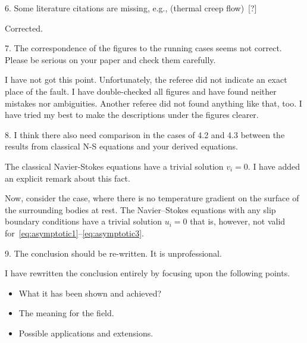 \documentclass{article}
\begin{document}
\begin{quoting}
6. Some literature citations are missing, e.g., (thermal creep flow)~[?]
\end{quoting}

Corrected.

\begin{quoting}
7. The correspondence of the figures to the running cases seems not
correct. Please be serious on your paper and check them carefully.
\end{quoting}

I have not got this point. Unfortunately, the referee did not indicate an exact place of the fault.
I have double-checked all figures and have found neither mistakes nor ambiguities.
Another referee did not found anything like that, too.
I have tried my best to make the descriptions under the figures clearer.

\begin{quoting}
8. I think there also need comparison in the cases of 4.2 and 4.3
between the results from classical N-S equations and your derived
equations.
\end{quoting}

The classical Navier-Stokes equations have a trivial solution \(v_i = 0\).
I have added an explicit remark about this fact.

\begin{leftbar}
Now, consider the case, where there is no temperature gradient on the surface of the surrounding bodies at rest.
The Navier--Stokes equations with any slip boundary conditions have a trivial solution \(u_i = 0\)
that is, however, not valid for~\eqref{eq:asymptotic1}--\eqref{eq:asymptotic3}.
\end{leftbar}

\begin{quoting}
9. The conclusion should be re-written. It is unprofessional.
\end{quoting}

I have rewritten the conclusion entirely by focusing upon the following points.
\begin{itemize}
\item What it has been shown and achieved?
\item The meaning for the field.
\item Possible applications and extensions.
\end{itemize}
\end{document}
